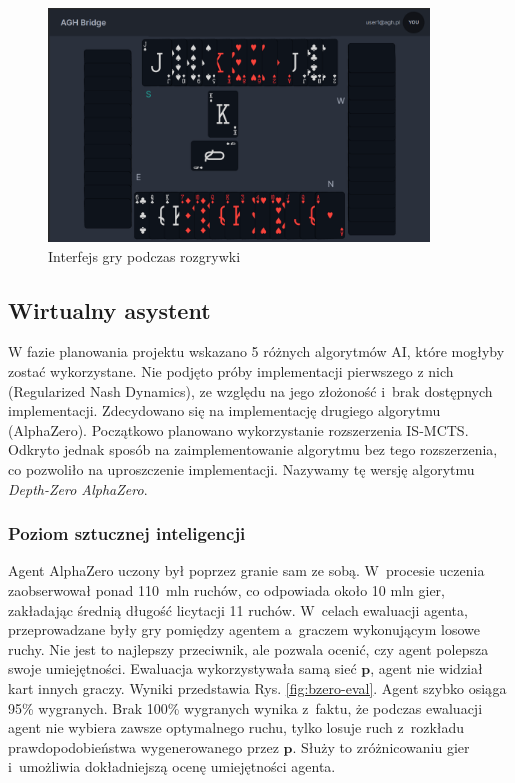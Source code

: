 \begin{figure}[h!]
  \centering
  \includegraphics[width=0.9\textwidth]{img/widoki/game.png}
  \caption{Interfejs gry podczas rozgrywki}
  \label{fig:game}
\end{figure}

\FloatBarrier

\subsection{Wirtualny asystent}

W fazie planowania projektu wskazano 5 różnych algorytmów AI, które mogłyby zostać
wykorzystane.
Nie podjęto próby implementacji pierwszego z nich (Regularized Nash Dynamics),
ze względu na jego złożoność i~brak dostępnych implementacji.
Zdecydowano się na implementację drugiego algorytmu (AlphaZero).
Początkowo planowano wykorzystanie rozszerzenia IS-MCTS.
Odkryto jednak sposób na zaimplementowanie algorytmu bez tego rozszerzenia,
co pozwoliło na uproszczenie implementacji. Nazywamy tę wersję algorytmu
\textit{Depth-Zero AlphaZero}.


\subsubsection{Poziom sztucznej inteligencji}
\label{subsubsec:mocai}

Agent AlphaZero uczony był poprzez granie sam ze sobą.
W~procesie uczenia zaobserwował ponad 110~mln ruchów,
co odpowiada około 10 mln gier, zakładając średnią
długość licytacji 11 ruchów.
W~celach ewaluacji agenta, przeprowadzane
były gry pomiędzy agentem a~graczem wykonującym
losowe ruchy.
Nie jest to najlepszy przeciwnik, ale pozwala
ocenić, czy agent polepsza swoje umiejętności.
Ewaluacja wykorzystywała samą sieć $\mathbf{p}$,
agent nie widział kart innych graczy.
Wyniki przedstawia Rys. \ref{fig:bzero-eval}.
Agent szybko osiąga 95\% wygranych.
Brak 100\% wygranych wynika z~faktu, że
podczas ewaluacji agent nie wybiera zawsze optymalnego ruchu,
tylko losuje ruch z~rozkładu prawdopodobieństwa
wygenerowanego przez $\mathbf{p}$.
Służy to zróżnicowaniu gier i~umożliwia
dokładniejszą ocenę umiejętności agenta.


